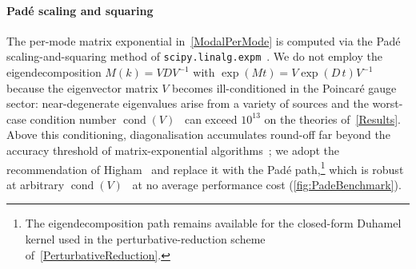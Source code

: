 \paragraph*{Pad\'e scaling and squaring} The per-mode matrix
exponential in~\cref{ModalPerMode} is computed via the Pad\'e
scaling-and-squaring method of
\lstinline!scipy.linalg.expm!~\cite{higham2009scaling}. We do not
employ the eigendecomposition $M(k) = V D V^{-1}$ with
$\exp(M t) = V \exp(D\, t) V^{-1}$ because the eigenvector matrix $V$
becomes ill-conditioned in the
Poincar\'e gauge sector: near-degenerate eigenvalues arise from a
variety of sources and the worst-case condition number
$\operatorname{cond}(V)$~\cite{golub2013matrix,higham2008functions} can exceed $10^{13}$ on the
theories of~\cref{Results}. Above this conditioning, diagonalisation
accumulates round-off far beyond the accuracy threshold of
matrix-exponential
algorithms~\cite{higham2008functions,molervanloan2003nineteen,golub2013matrix,trefethen1997numerical};
we adopt the recommendation of Higham~\cite[\S~2.3]{higham2008functions} and
replace it with the Pad\'e path,\footnote{The eigendecomposition path
remains available for the closed-form Duhamel kernel used
in the perturbative-reduction scheme of~\cref{PerturbativeReduction}.}
which is robust at arbitrary
$\operatorname{cond}(V)$~\cite{higham2009scaling,higham2008functions}
at no average performance cost (\cref{fig:PadeBenchmark}).

